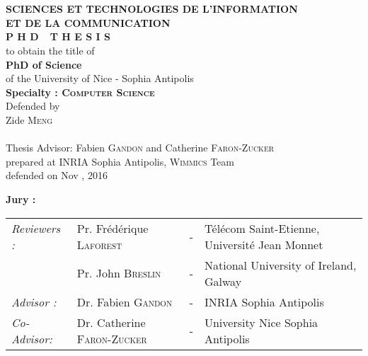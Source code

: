 \begin{titlepage}
\begin{center}
 \\
\vspace*{0.3cm}
 \\
\noindent \textbf{SCIENCES ET TECHNOLOGIES DE L'INFORMATION \\ ET DE LA COMMUNICATION} \\
\vspace*{0.5cm}
\noindent \Huge \textbf{P H D\ \ T H E S I S} \\
\vspace*{0.3cm}
\noindent \large {to obtain the title of} \\
\vspace*{0.3cm}
\noindent \LARGE \textbf{PhD of Science} \\
\vspace*{0.3cm}
\noindent \Large of the University of Nice - Sophia Antipolis \\
\noindent \Large \textbf{Specialty : \textsc{Computer Science}}\\
\vspace*{0.4cm}
\noindent \large {Defended by\\}
\noindent \LARGE Zide \textsc{Meng} \\
\vspace*{0.4cm}
\\
\vspace*{0.4cm}
\noindent \Large Thesis Advisor: Fabien \textsc{Gandon} and Catherine \textsc{Faron-Zucker} \\
\vspace*{0.2cm}
\noindent \Large prepared at INRIA Sophia Antipolis, \textsc{Wimmics} Team\\
\vspace*{0.2cm}
\noindent \large defended on Nov , 2016 \\
\vspace*{0.5cm}
\end{center}
\noindent \large \textbf{Jury :} \\
\begin{center}
\noindent \large 
\begin{tabular}{llcl}
      \textit{Reviewers :}	&Pr. Fr\'ed\'erique \textsc{Laforest }		& - &T\'el\'ecom Saint-Etienne, Universit\'e Jean Monnet\\
				&Pr. John \textsc{Breslin}		& - & National University of Ireland, Galway\\
      \textit{Advisor :}	&Dr. Fabien \textsc{Gandon}		& - & INRIA Sophia Antipolis \\
      \textit{Co-Advisor:}  &Dr. Catherine \textsc{Faron-Zucker} & - & University Nice Sophia Antipolis\\
                            

\end{tabular}
\end{center}
\end{titlepage}
